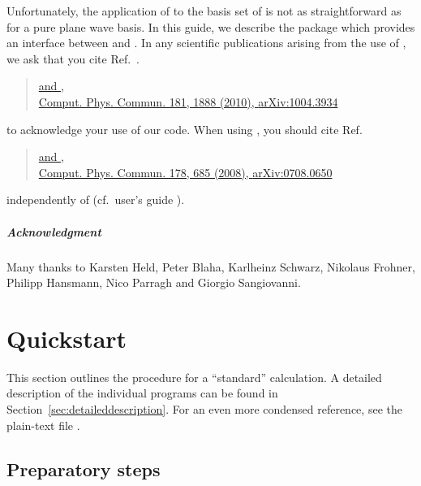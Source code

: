 Unfortunately, the application of \wannier to the \lapw basis set of
\wien is not as straightforward as for a pure plane wave basis.  In
this guide, we describe the package \wtow which provides an interface
between \wien and \wannier.  In any scientific publications arising
from the use of \wtow, we ask that you cite Ref.~\cite{w2w}.
%
\begin{quote}
  \href{http://www.sciencedirect.com/science/article/pii/S0010465510002948}{
    and ,\\
    Comput. Phys. Commun. 181, 1888 (2010),
  }
  \href{http://arxiv.org/abs/1004.3934}{arXiv:1004.3934}
\end{quote}
%
to acknowledge your use of our code.  When using \wannier, you should
cite Ref.~\cite{wannier90_orig}
%
\begin{quote}
  \href{http://www.sciencedirect.com/science/article/pii/S0010465507004936}{
    and ,\\
    Comput. Phys. Commun. 178, 685 (2008),
  }
  \href{http://arxiv.org/abs/0708.0650}{arXiv:0708.0650}
\end{quote}
%
independently of \wtow (cf.~\wannier user's guide \cite{wannier90}).

\paragraph{Acknowledgment}
%
Many thanks to Karsten Held, Peter Blaha, Karlheinz Schwarz, Nikolaus
Frohner, Philipp Hansmann, Nico Parragh and Giorgio Sangiovanni.


\tableofcontents

\mainmatter


\chapter{Quickstart}
\label{sec:quickstart}
\minitoc

This section outlines the procedure for a ``standard'' \wtow
calculation.  A detailed description of the individual programs can be
found in Section~\ref{sec:detaileddescription}.  For an even more
condensed reference, see the plain-text file .


\section{Preparatory steps}
\label{sec:quickstart_prep}

